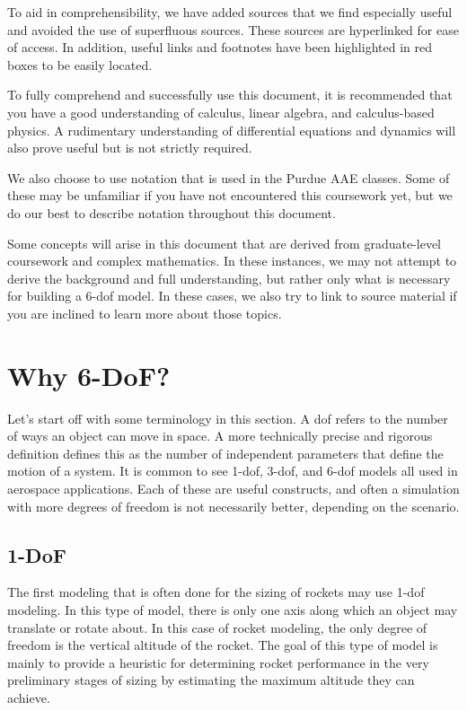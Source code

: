 \documentclass[12pt]{report}
\begin{document}
To aid in comprehensibility, we have added sources that we find especially useful and avoided the use of superfluous sources. These sources are hyperlinked for ease of access. In addition, useful links and footnotes have been highlighted in red boxes to be easily located. 

To fully comprehend and successfully use this document, it is recommended that you have a good understanding of calculus, linear algebra, and calculus-based physics. A rudimentary understanding of differential equations and dynamics will also prove useful but is not strictly required.

We also choose to use notation that is used in the Purdue AAE classes. Some of these may be unfamiliar if you have not encountered this coursework yet, but we do our best to describe notation throughout this document.

Some concepts will arise in this document that are derived from graduate-level coursework and complex mathematics. In these instances, we may not attempt to derive the background and full understanding, but rather only what is necessary for building a 6-\gls{dof} model. In these cases, we also try to link to source material if you are inclined to learn more about those topics.

\section{Why 6-DoF?}
Let’s start off with some terminology in this section. A \gls{dof} refers to the number of ways an object can move in space. A more technically precise and rigorous definition defines this as the number of independent parameters that define the motion of a system. It is common to see 1-\gls{dof}, 3-\gls{dof}, and 6-\gls{dof} models all used in aerospace applications. Each of these are useful constructs, and often a simulation with more degrees of freedom is not necessarily better, depending on the scenario.
\subsection{1-DoF}
The first modeling that is often done for the sizing of rockets may use 1-\gls{dof} modeling. In this type of model, there is only one axis along which an object may translate or rotate about. In this case of rocket modeling, the only degree of freedom is the vertical altitude of the rocket. The goal of this type of model is mainly to provide a heuristic for determining rocket performance in the very preliminary stages of sizing by estimating the maximum altitude they can achieve.
\end{document}

